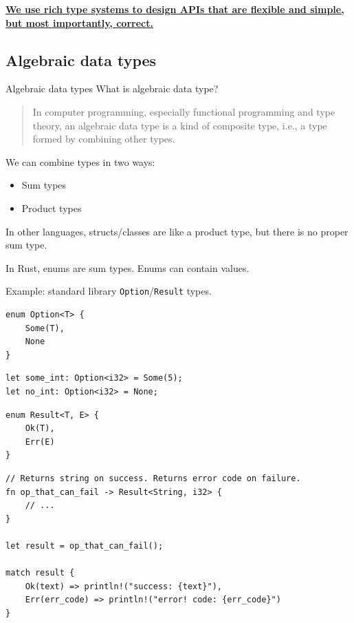 \documentclass[
  9pt,
  ignorenonframetext,
]{beamer}
\newcommand{\passthrough}[1]{#1}
\providecommand{\tightlist}{%
  \setlength{\itemsep}{0pt}\setlength{\parskip}{0pt}}
\begin{document}
\begin{frame}
\textbf{\href{https://fasterthanli.me/articles/aiming-for-correctness-with-types}{We
use rich type systems to design APIs that are flexible and simple, but
most importantly, correct.}}
\end{frame}

\hypertarget{algebraic-data-types}{%
\subsection{Algebraic data types}\label{algebraic-data-types}}

\begin{frame}{Algebraic data types}
What is algebraic data type?

\begin{quote}
In computer programming, especially functional programming and type
theory, an algebraic data type is a kind of composite type, i.e., a type
formed by combining other types.
\end{quote}

We can combine types in two ways:

\begin{itemize}
\tightlist
\item
  Sum types
\item
  Product types
\end{itemize}

In other languages, structs/classes are like a product type, but there
is no proper sum type.
\end{frame}

\begin{frame}[fragile]
In Rust, enums are sum types. Enums can contain values.

Example: standard library
\passthrough{\lstinline!Option!}/\passthrough{\lstinline!Result!} types.

\begin{lstlisting}
enum Option<T> {
    Some(T),
    None
}
\end{lstlisting}

\begin{lstlisting}
let some_int: Option<i32> = Some(5);
let no_int: Option<i32> = None;
\end{lstlisting}

\begin{lstlisting}
enum Result<T, E> {
    Ok(T),
    Err(E)
}
\end{lstlisting}

\begin{lstlisting}
// Returns string on success. Returns error code on failure.
fn op_that_can_fail -> Result<String, i32> {
    // ...
}

let result = op_that_can_fail();

match result {
    Ok(text) => println!("success: {text}"),
    Err(err_code) => println!("error! code: {err_code}")
}
\end{lstlisting}
\end{frame}
\end{document}
